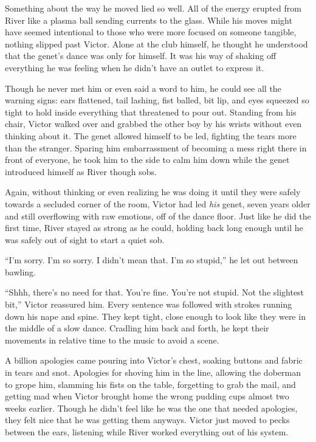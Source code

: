 Something about the way he moved lied so well. All of the energy erupted
from River like a plasma ball sending currents to the glass. While his
moves might have seemed intentional to those who were more focused on
someone tangible, nothing slipped past Victor. Alone at the club
himself, he thought he understood that the genet's dance was only for
himself. It was his way of shaking off everything he was feeling when he
didn't have an outlet to express it.

Though he never met him or even said a word to him, he could see all the
warning signs: ears flattened, tail lashing, fist balled, bit lip, and
eyes squeezed so tight to hold inside everything that threatened to pour
out. Standing from his chair, Victor walked over and grabbed the other
boy by his wrists without even thinking about it. The genet allowed
himself to be led, fighting the tears more than the stranger. Sparing
him embarrassment of becoming a mess right there in front of everyone,
he took him to the side to calm him down while the genet introduced
himself as River though sobs.

Again, without thinking or even realizing he was doing it until they
were safely towards a secluded corner of the room, Victor had led
\emph{his} genet, seven years older and still overflowing with raw
emotions, off of the dance floor. Just like he did the first time, River
stayed as strong as he could, holding back long enough until he was
safely out of sight to start a quiet sob.

``I'm sorry. I'm so sorry. I didn't mean that. I'm so stupid,'' he let
out between bawling.

``Shhh, there's no need for that. You're fine. You're not stupid. Not
the slightest bit,'' Victor reassured him. Every sentence was followed
with strokes running down his nape and spine. They kept tight, close
enough to look like they were in the middle of a slow dance. Cradling
him back and forth, he kept their movements in relative time to the
music to avoid a scene.

A billion apologies came pouring into Victor's chest, soaking buttons
and fabric in tears and snot. Apologies for shoving him in the line,
allowing the doberman to grope him, slamming his fists on the table,
forgetting to grab the mail, and getting mad when Victor brought home
the wrong pudding cups almost two weeks earlier. Though he didn't feel
like he was the one that needed apologies, they felt nice that he was
getting them anyways. Victor just moved to pecks between the ears,
listening while River worked everything out of his system.

